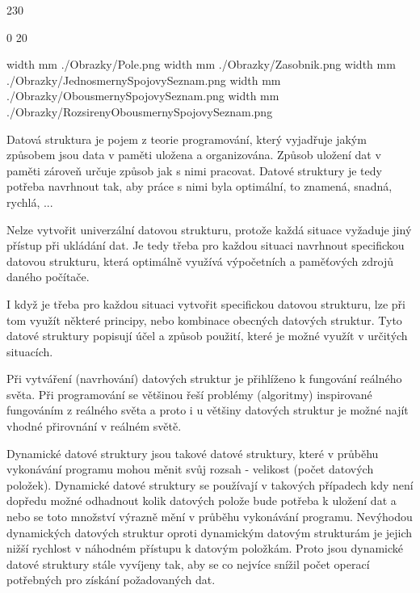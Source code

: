 
 {230}

 {0}
 {20}
\cz
\NewRomane


\pdfximage width \the\SirkaOdstavce mm {./Obrazky/Pole.png}
\pdfximage width \the\SirkaOdstavce mm {./Obrazky/Zasobnik.png}
\pdfximage width \the\SirkaOdstavce mm {./Obrazky/JednosmernySpojovySeznam.png}
\pdfximage width \the\SirkaOdstavce mm {./Obrazky/ObousmernySpojovySeznam.png}
\pdfximage width \the\SirkaOdstavce mm {./Obrazky/RozsirenyObousmernySpojovySeznam.png}


\Obsah


Datová struktura je pojem z teorie programování, který vyjadřuje jakým způsobem jsou data v paměti uložena a organizována. Způsob uložení dat v paměti zároveň určuje způsob jak s nimi pracovat. Datové struktury je tedy potřeba navrhnout tak, aby práce s nimi byla optimální, to znamená, snadná, rychlá, ...

Nelze vytvořit univerzální datovou strukturu, protože každá situace vyžaduje jiný přístup při ukládání dat. Je tedy třeba pro každou situaci navrhnout specifickou datovou strukturu, která optimálně využívá výpočetních a paměťových zdrojů daného počítače. 

I když je třeba pro každou situaci vytvořit specifickou datovou strukturu, lze při tom využít některé principy, nebo kombinace obecných datových struktur. Tyto datové struktury popisují účel a způsob použití, které je možné využít v určitých situacích. 

Při vytváření (navrhování) datových struktur je přihlíženo k fungování reálného světa. Při programování se většinou řeší problémy (algoritmy) inspirované fungováním z reálného světa a proto i u většiny datových struktur je možné najít vhodné přirovnání v reálném světě.



Dynamické datové struktury jsou takové datové struktury, které v průběhu vykonávání programu mohou měnit svůj rozsah - velikost (počet datových položek). Dynamické datové struktury se používají v takových případech kdy není dopředu možné odhadnout kolik datových polože bude potřeba k uložení dat a nebo se toto množství výrazně mění v průběhu vykonávání programu.
Nevýhodou dynamických datových struktur oproti dynamickým datovým strukturám je jejich nižší rychlost v náhodném přístupu k datovým položkám. Proto jsou dynamické datové struktury stále vyvíjeny tak, aby se co nejvíce snížil počet operací potřebných pro získání požadovaných dat. 

